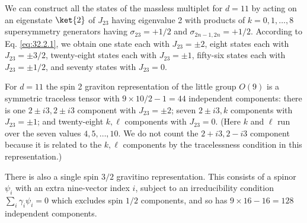 We can construct all the states of the massless multiplet for \(d=11\)
by acting on an eigenstate \(\ket{2}\) of \(J_{23}\) having
eigenvalue 2 with products of \(k=0,1,\ldots,8\) supersymmetry generators
having \(\sigma_{23}=+1/2\) and \(\sigma_{2n-1,2n}=+1/2\). According to
Eq. \eqref{eq:32.2.1}, we obtain one state each with \(J_{23}=\pm2\),
eight states each with \(J_{23}=\pm3/2\), twenty-eight states each with
\(J_{23}=\pm1\), fifty-six states each with \(J_{23}=\pm1/2\), and
seventy states with \(J_{23}=0\).

For \(d=11\) the spin 2 graviton representation of the little group
\(O(9)\) is a symmetric traceless tensor with
\(9\times10/2-1=44\) independent components: there is one
\(2\mathbin{\pm}i3,2\mathbin{\pm}i3\) component with
\(J_{23}=\pm2\); seven \(2\mathbin{\pm}i3,k\) components with
\(J_{23}=\pm1\); and twenty-eight \(k,\ell\) components with
\(J_{23}=0\). (Here \(k\) and \(\ell\) run over the seven values
\(4,5,\ldots,10\). We do not count the
\(2+i3,2-i3\) component because it is related to the \(k,\ell\)
components by the tracelessness condition in this representation.)

There is also a single spin \(3/2\) gravitino representation. This
consists of a spinor \(\psi_i\) with an extra nine-vector index \(i\),
subject to an irreducibility condition \(\sum_i\gamma_i\psi_i=0\) which
excludes spin \(1/2\) components, and so has
\(9\times16-16=128\) independent components.

